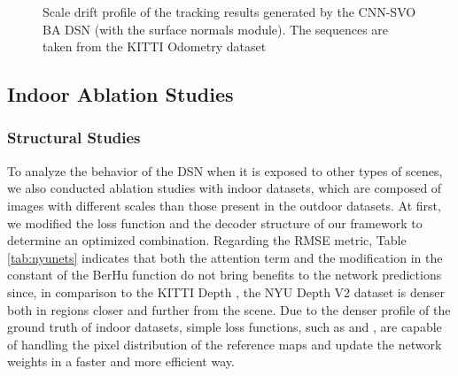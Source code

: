 \documentclass[5p]{elsarticle}
\begin{document}
\begin{figure}[!htb]
\centering
{}
\caption{Scale drift profile of the tracking results generated by the CNN-SVO  BA  DSN (with the surface normals module). The sequences are taken from the KITTI Odometry dataset \cite{Geiger2012CVPR}}
\label{graph:kittiodometry_scale}
\end{figure}


\subsection{Indoor Ablation Studies}

\subsubsection{Structural Studies}

To analyze the behavior of the DSN  when it is exposed to other types of scenes, we also conducted ablation studies with indoor datasets, which are composed of images with different scales than those present in the outdoor datasets. At first, we modified the loss function and the decoder structure of our framework to determine an optimized combination. Regarding the RMSE metric, Table \ref{tab:nyunets} indicates that both the attention term and the modification in the constant  of the BerHu function do not bring benefits to the network predictions since, in comparison to the KITTI Depth \cite{uhrig2017sparsity}, the NYU Depth V2 dataset \cite{silberman2012indoor} is denser both in regions closer and further from the scene. Due to the denser profile of the ground truth of indoor datasets, simple loss functions, such as  and , are capable of handling the pixel distribution of the reference maps and update the network weights in a faster and more efficient way.
\end{document}
